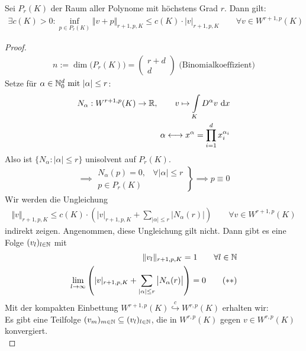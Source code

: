 \enter
\begin{lemma}\label{lemma4.11DenyLions}\enter
Sei $P_r(K)$ der Raum aller Polynome mit höchstens Grad $r$. Dann gilt:
\begin{align*}
\exists c(K)>0:\inf\limits_{p\in P_r(K)}\Vert v+p\Vert_{r+1,p,K}\leq c(K)\cdot |v|_{r+1,p,K}\qquad\forall v\in W^{r+1,p}(K)
\end{align*}
\end{lemma}
\begin{proof}
\begin{align*}
n:=\dim \big(P_r(K)\big)=\begin{pmatrix}
r+d\\ d
\end{pmatrix}\text{ (Binomialkoeffizient)}
\end{align*}
Setze  für $\alpha\in\mathbb{N}_0^d\text{ mit }|\alpha|\leq r $:
\begin{align*}
N_\alpha:W^{r+1,p}(K)\to\mathbb{R},\qquad v\mapsto\int\limits_K D^\alpha v\text{ d} x\\
\alpha\longleftrightarrow x^\alpha =\prod\limits_{i=1}^d x_i^{\alpha_i}
\end{align*}
Also ist $\big\lbrace N_\alpha:|\alpha|\leq r\big\rbrace$ unisolvent auf $P_r(K)$.
\begin{align*}
\implies\left.
	\begin{array}{cl}
	N_\alpha(p)=0, &\forall |\alpha|\leq r \\
	p\in P_r(K)&
	\end{array}
\right\rbrace
\implies p\equiv 0
\end{align*}
Wir werden die Ungleichung
\begin{align}\label{eqProof4.11Stern}\tag{$\ast$}
\Vert v\Vert_{r+1,p,K}\leq c(K)\cdot\left(|v|_{r+1,p,K}+\sum\limits_{|\alpha|\leq r}\big|N_\alpha (r)\big|\right)\qquad\forall v\in W^{r+1,p}(K)
\end{align}
indirekt zeigen. Angenommen, diese Ungleichung gilt nicht. Dann gibt es eine Folge $(v_l)_{l\in\mathbb{N}}$ mit 
\begin{align}
\Vert v_l\Vert_{r+1,p,K}=1\qquad\forall l\in\mathbb{N}\nonumber\\
\lim\limits_{l\to\infty} \left(|v|_{r+1,p,K}+\sum\limits_{|\alpha|\leq r}\big|N_\alpha (r)\big|\right)=0\label{eqProof4.11SternStern}\tag{$\ast\ast$}
\end{align}
Mit der kompakten Einbettung $W^{r+1,p}(K)\stackrel{c}{\hookrightarrow} W^{r,p}(K)$ erhalten wir:\\
Es gibt eine Teilfolge $(v_m)_{m\in\mathbb{N}}\subseteq(v_l)_{l\in\mathbb{N}}$, die in $W^{r,p}(K)$ gegen $v\in W^{r,p}(K)$ konvergiert.\\

\end{proof}
